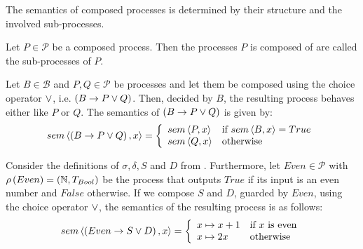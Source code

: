 The semantics of composed processes is determined by their structure and the involved sub-processes.

\begin{definition}
Let $P \in \mathcal{P}$ be a composed process. Then the processes $P$ is composed of are called the sub-processes of $P$.

\hfill\qedsymbol
\end{definition}

\begin{definition}
\label{def:sem_choice}
Let $B \in \mathcal{B}$ and $P, Q \in \mathcal{P}$ be processes and let them be composed using the choice operator $\vee$, i.e. $\left( B \to P \vee Q \right)$. Then, decided by $B$, the resulting process behaves either like $P$ or $Q$. The semantics of $\left( B \to P \vee Q \right)$ is given by:
  \begin{equation}
    \label{eqn:sem_choice}
    sem \left\langle \left( B \to P \vee Q \right), x \right\rangle = \left\{ \begin{array}{ll}
      sem \left\langle P, x \right\rangle & \text{if } sem \left\langle B, x \right\rangle = True \\
      sem \left\langle Q, x \right\rangle & \text{otherwise}
    \end{array}\right.
  \end{equation}
  
  \hfill\qedsymbol
\end{definition}

\begin{example}
\label{exp:sem_chice}
Consider the definitions of $\sigma, \delta, S$ and $D$ from . Furthermore, let $Even \in \mathcal{P}$ with $\rho \left( Even \right) = \left( \mathbb{N}, T_{Bool} \right)$ be the process that outputs $True$ if its input is an even number and $False$ otherwise. If we compose $S$ and $D$, guarded by $Even$, using the choice operator $\vee$, the semantics of the resulting process is as follows:
  \begin{equation*}
    sem \left\langle \left( Even \to S \vee D \right), x \right\rangle = \left\{\begin{array}{ll}
      x \mapsto x+1 & \text{if } x \text{ is even} \\
      x \mapsto 2x & \text{otherwise}
    \end{array}\right.
  \end{equation*}
  \hfill\qedsymbol
\end{example}


